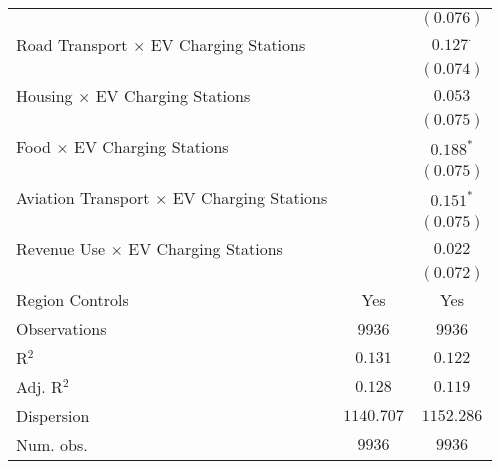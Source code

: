 \begin{center}
\begin{tiny}
\begin{longtable}{l@{} c@{} c@{}}
                                                          &                  & $(0.076)$        \\
\quad Road Transport $\times$ EV Charging Stations        &                  & $0.127^{\cdot}$  \\
                                                          &                  & $(0.074)$        \\
\quad Housing $\times$ EV Charging Stations               &                  & $0.053$          \\
                                                          &                  & $(0.075)$        \\
\quad Food $\times$ EV Charging Stations                  &                  & $0.188^{*}$      \\
                                                          &                  & $(0.075)$        \\
\quad Aviation Transport $\times$ EV Charging Stations    &                  & $0.151^{*}$      \\
                                                          &                  & $(0.075)$        \\
\quad Revenue Use $\times$ EV Charging Stations           &                  & $0.022$          \\
                                                          &                  & $(0.072)$        \\
\hline
Region Controls                                           & Yes              & Yes              \\
Observations                                              & 9936             & 9936             \\
R$^2$                                                     & $0.131$          & $0.122$          \\
Adj. R$^2$                                                & $0.128$          & $0.119$          \\
Dispersion                                                & $1140.707$       & $1152.286$       \\
Num. obs.                                                 & $9936$           & $9936$           \\
\end{longtable}
\end{tiny}
\end{center}
